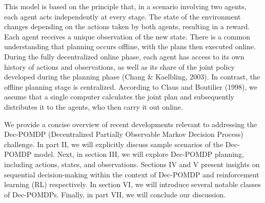 This model is based on the principle that, in a scenario involving two agents, each agent acts independently at every stage. The state of the environment changes depending on the actions taken by both agents, resulting in a reward. Each agent receives a unique observation of the new state. There is a common understanding that planning occurs offline, with the plans then executed online. During the fully decentralized online phase, each agent has access to its own history of actions and observations, as well as its share of the joint policy developed during the planning phase (Chang & Kaelbling, 2003). In contrast, the offline planning stage is centralized. According to Claus and Boutilier (1998), we assume that a single computer calculates the joint plan and subsequently distributes it to the agents, who then carry it out online.

We provide a concise overview of recent developments relevant to addressing the Dec-POMDP (Decentralized Partially Observable Markov Decision Process) challenge. In part II, we will explicitly discuss sample scenarios of the Dec-POMDP model. Next, in section III, we will explore Dec-POMDP planning, including actions, states, and observations. Sections IV and V present insights on sequential decision-making within the context of Dec-POMDP and reinforcement learning (RL) respectively. In section VI, we will introduce several notable classes of Dec-POMDPs. Finally, in part VII, we will conclude our discussion.



